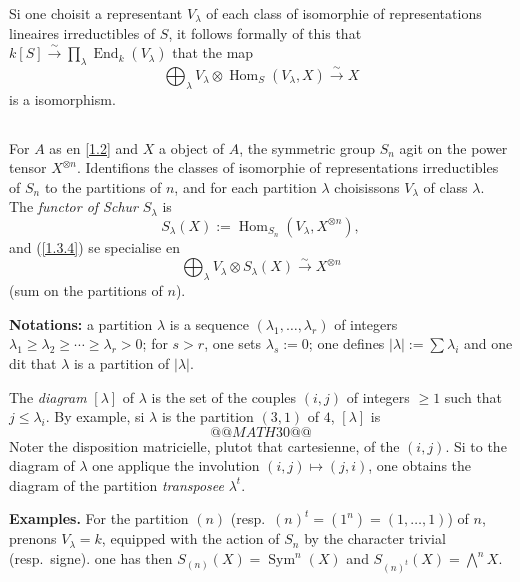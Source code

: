 \documentclass[11pt,a4paper]{article}
\theoremstyle{plain}
\theoremstyle{definition}
\DeclareMathOperator{\Hom}{Hom}
\DeclareMathOperator{\End}{End}
\DeclareMathOperator{\Sym}{Sym}
\begin{document}
Si one choisit a representant $V_\lambda$ of each class of isomorphie of representations lineaires irreductibles of $S$, it follows formally of this that $k[S]\xrightarrow{\sim}\prod_\lambda\End_k(V_\lambda)$ that the map
\begin{equation}\label{1.3.4}
\bigoplus_\lambda V_\lambda\otimes\Hom_S(V_\lambda,X)\xrightarrow{\sim} X
\end{equation}
is a isomorphism.

\subsection{}\label{1.4}

For $A$ as en \ref{1.2} and $X$ a object of $A$, the symmetric group $S_n$ agit on the power tensor $X^{\otimes n}$. Identifions the classes of isomorphie of representations irreductibles of $S_n$ to the partitions of $n$, and for each partition $\lambda$ choisissons $V_\lambda$ of class $\lambda$. The \emph{functor of Schur} $S_\lambda$ is
\begin{equation}\label{1.4.1}
S_\lambda(X):=\Hom_{S_n}(V_\lambda,X^{\otimes n}),
\end{equation}
and (\ref{1.3.4}) se specialise en
\begin{equation}\label{1.4.2}
\bigoplus_\lambda V_\lambda\otimes S_\lambda(X)\xrightarrow{\sim} X^{\otimes n}
\end{equation}
(sum on the partitions of $n$).

\medskip\noindent\textbf{Notations:} a partition $\lambda$ is a sequence $(\lambda_1,\ldots,\lambda_r)$ of integers $\lambda_1\geq\lambda_2\geq\cdots\geq\lambda_r>0$; for $s>r$, one sets $\lambda_s:=0$; one defines $|\lambda|:=\sum\lambda_i$ and one dit that $\lambda$ is a partition of $|\lambda|$.

The \emph{diagram} $[\lambda]$ of $\lambda$ is the set of the couples $(i,j)$ of integers $\geq1$ such that $j\leq\lambda_i$. By example, si $\lambda$ is the partition $(3,1)$ of $4$, $[\lambda]$ is
\[
@@MATH30@@
\]
Noter the disposition matricielle, plutot that cartesienne, of the $(i,j)$. Si to the diagram of $\lambda$ one applique the involution $(i,j)\mapsto(j,i)$, one obtains the diagram of the partition \emph{transposee} $\lambda^t$.

\medskip\noindent\textbf{Examples.} For the partition $(n)$ (resp.~$(n)^t=(1^n)=(1,\ldots,1)$) of $n$, prenons $V_\lambda=k$, equipped with the action of $S_n$ by the character trivial (resp.~signe). one has then $S_{(n)}(X)=\Sym^n(X)$ and $S_{(n)^t}(X)=\bigwedge^nX$.
\end{document}
